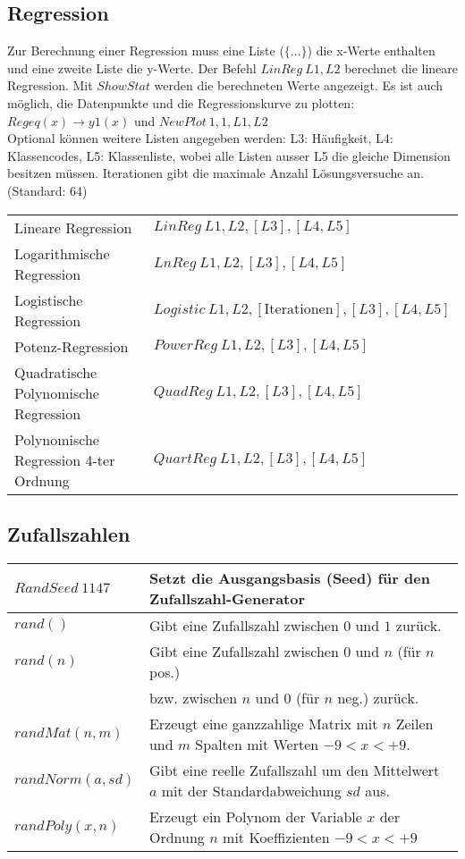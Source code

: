 \subsection{Regression}
Zur Berechnung einer Regression muss eine Liste ($\{...\}$) die x-Werte enthalten 
und eine zweite Liste die y-Werte. Der Befehl $LinReg \: L1,L2$ berechnet die lineare 
Regression. Mit $ShowStat$ werden die berechneten Werte angezeigt. 
Es ist auch möglich, die Datenpunkte und die Regressionskurve zu plotten: 
$Regeq(x) \to y1(x)$ und $NewPlot \: 1,1,L1,L2$ \\
Optional können weitere Listen angegeben werden: L3: Häufigkeit, L4: Klassencodes, 
L5: Klassenliste, wobei alle Listen ausser L5 die gleiche Dimension besitzen müssen.
Iterationen gibt die maximale Anzahl Lösungsversuche an. (Standard: 64)\\
\begin{tabular}{l l}
Lineare Regression						&	$LinReg \: L1,L2,[L3],[L4,L5]$ \\
Logarithmische Regression				&	$LnReg \: L1,L2,[L3],[L4,L5]$ \\
Logistische Regression					&	$Logistic \: L1,L2,[\text{Iterationen}],[L3],[L4,L5]$\\
Potenz-Regression						&	$PowerReg \: L1,L2,[L3],[L4,L5]$ \\
Quadratische Polynomische Regression	&	$QuadReg \: L1,L2,[L3],[L4,L5]$ \\
Polynomische Regression 4-ter Ordnung	&	$QuartReg \: L1,L2,[L3],[L4,L5]$ \\
\end{tabular}

\subsection{Zufallszahlen}
\begin{tabular}{|l|l|}
	\hline
	$RandSeed \: 1147$					& Setzt die Ausgangsbasis (Seed) für den Zufallszahl-Generator \\ \hline
	$rand()$							& Gibt eine Zufallszahl zwischen $0$ und $1$ zurück. \\
	$rand(n)$							& Gibt eine Zufallszahl zwischen $0$ und $n$ (für $n$ pos.) \\ 
										& bzw. zwischen $n$ und $0$ (für $n$ neg.) zurück. \\ \hline
	$randMat(n,m)$						& Erzeugt eine ganzzahlige Matrix mit $n$ Zeilen und $m$ Spalten mit Werten $-9<x<+9$. \\ \hline
	$randNorm(a,sd)$					& Gibt eine reelle Zufallszahl um den Mittelwert $a$ mit der Standardabweichung $sd$ aus. \\ \hline
	$randPoly(x,n)$						& Erzeugt ein Polynom der Variable $x$ der Ordnung $n$ mit Koeffizienten $-9<x<+9$ \\ \hline
\end{tabular}